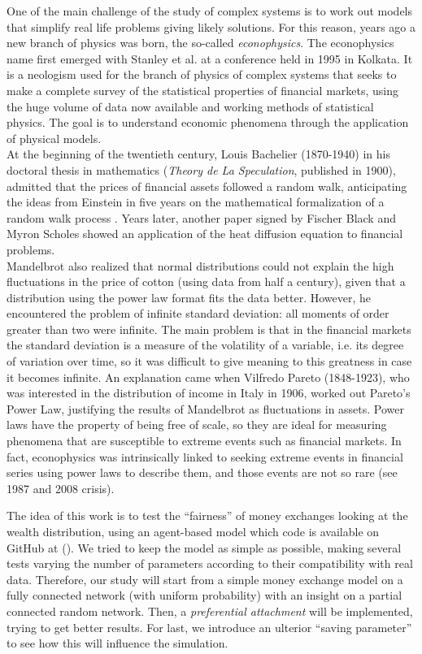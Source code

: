 One of the main challenge of the study of complex systems is to work out models that simplify real life problems giving likely solutions.
For this reason, years ago a new branch of physics was born, the so-called \emph{econophysics}.
The econophysics name first emerged with Stanley et al. at a conference held in 1995 in Kolkata.
It is a neologism used for the branch of physics of complex systems that seeks to make a complete survey of the statistical properties of financial markets, using the huge volume of data now available and working methods of statistical physics.
The goal is to understand economic phenomena through the application of physical models. \\
At the beginning of the twentieth century, Louis Bachelier (1870-1940) in his doctoral thesis in mathematics (\emph{Theory de La Speculation}, published in 1900), admitted that the prices of financial assets followed a random walk, anticipating the ideas from Einstein in five years on the mathematical formalization of a random walk process \cite{history}.
Years later, another paper signed by Fischer Black and Myron Scholes showed an application of the heat diffusion equation to financial problems. \\
Mandelbrot \cite{mandelbrot1965} also realized that normal distributions could not explain the high fluctuations in the price of cotton (using data from half a century), given that a distribution using the power law format fits the data better.  
However, he encountered the problem of infinite standard deviation: all moments of order greater than two were infinite.
The main problem is that in the financial markets the standard deviation is a measure of the volatility of a variable, i.e. its degree of variation over time, so it was difficult to give meaning to this greatness in case it becomes infinite.
An explanation came when Vilfredo Pareto (1848-1923), who was interested in the distribution of income in Italy in 1906, worked out Pareto's Power Law, justifying the results of Mandelbrot as fluctuations in assets.
Power laws have the property of being free of scale, so they are ideal for measuring phenomena that are susceptible to extreme events such as financial markets.
In fact, econophysics was intrinsically linked to seeking extreme events in financial series using power laws to describe them, and those events are not so rare (see 1987 and 2008 crisis).

The idea of this work is to test the ``fairness'' of money exchanges looking at the wealth distribution, using an agent-based model which code is available on GitHub at (\cite{https://github.com/SimonB00/WealthDistributionModel}).
We tried to keep the model as simple as possible, making several tests varying the number of parameters according to their compatibility with real data.
Therefore, our study will start from a simple money exchange model on a fully connected network (with uniform probability) with an insight on a partial connected random network.
Then, a \emph{preferential attachment} will be implemented, trying to get better results.
For last, we introduce an ulterior ``saving parameter'' to see how this will influence the simulation.
